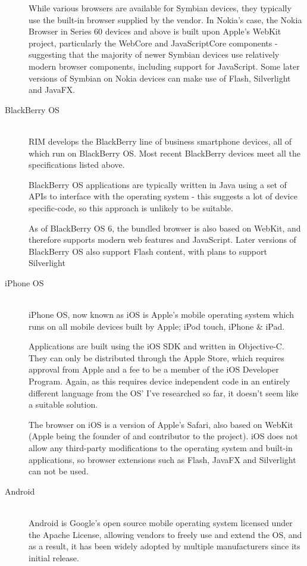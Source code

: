 \documentclass[a4papert,11pt,notitlepage]{article}
\begin{document}
\begin{appendices}
\begin{description}
While various browsers are available for Symbian devices, they typically use the built-in browser supplied by the vendor. In Nokia's case, the Nokia Browser in Series 60 devices and above is built upon Apple's WebKit project\cite{nokia:browser}, particularly the WebCore and JavaScriptCore components - suggesting that the majority of newer Symbian devices use relatively modern browser components, including support for JavaScript. Some later versions of Symbian on Nokia devices can make use of Flash, Silverlight and JavaFX.

\item[BlackBerry OS] \hfill \\
RIM develops the BlackBerry\cite{blackberry:web} line of business smartphone devices, all of which run on BlackBerry OS. Most recent BlackBerry devices meet all the specifications listed above.

BlackBerry OS applications are typically written in Java using a set of APIs to interface with the operating system - this suggests a lot of device specific-code, so this approach is unlikely to be suitable.

As of BlackBerry OS 6, the bundled browser is also based on WebKit\cite{rim:browser}, and therefore supports modern web features and JavaScript. Later versions of BlackBerry OS also support Flash content, with plans to support Silverlight

\item[iPhone OS] \hfill \\
iPhone OS\cite{ios:web}, now known as iOS is Apple's mobile operating system which runs on all mobile devices built by Apple; iPod touch, iPhone \& iPad. 

Applications are built using the iOS SDK and written in Objective-C. They can only be distributed through the Apple Store, which requires approval from Apple and a fee to be a member of the iOS Developer Program. Again, as this requires device independent code in an entirely different language from the OS' I've researched so far, it doesn't seem like a suitable solution.

The browser on iOS is a version of Apple's Safari, also based on WebKit (Apple being the founder of and contributor to the project). iOS does not allow any third-party modifications to the operating system and built-in applications, so browser extensions such as Flash, JavaFX and Silverlight can not be used.

\item[Android] \hfill \\
Android\cite{android:web} is Google's open source mobile operating system licensed under the Apache License, allowing vendors to freely use and extend the OS, and as a result, it has been widely adopted by multiple manufacturers since its initial release.


\end{description}
\end{appendices}
\end{document}
